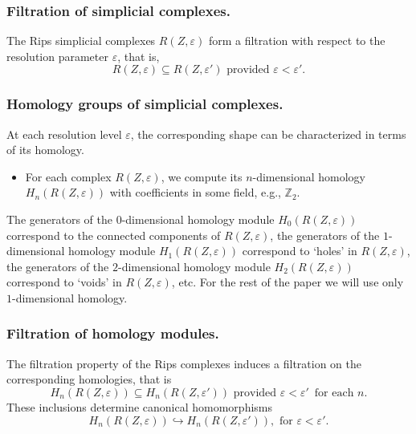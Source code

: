 \documentclass[11pt]{amsart}
\theoremstyle{definition}
\theoremstyle{remark}
\numberwithin{equation}{section}
\newcommand{\eps}{\varepsilon}
\begin{document}
\subsubsection{Filtration of simplicial complexes.} The Rips simplicial complexes $R(Z, \eps)$ form a filtration with respect to the resolution parameter $\eps$, that is, \[R(Z,\eps)\subseteq
R(Z,\eps')\textrm{ provided } \eps<\eps'.\]


\subsubsection{Homology groups of simplicial complexes.}
At each resolution level $\eps$, the corresponding shape can be characterized in terms of its homology.
\begin{itemize}\item For each complex $R(Z, \eps)$, we   compute its $n$-dimensional homology
$H_n(R(Z,\eps))$ with coefficients in some field, e.g., $\mathbb{Z}_2$.
\end{itemize} The generators of the $0$-dimensional homology module $H_0(R(Z,\eps))$  correspond to the
connected components of $R(Z,\eps)$, the generators of the $1$-dimensional homology module  $H_1(R(Z,\eps))$ correspond to   `holes' in $R(Z,\eps)$,  the
generators of the $2$-dimensional homology module  $H_2(R(Z,\eps))$ correspond to  `voids' in $R(Z,\eps)$, etc.
For the rest of the paper we will use only  $1$-dimensional homology.


\subsubsection{Filtration of homology modules.} The filtration property of the Rips complexes induces a filtration on the corresponding homologies, that is
\[H_n(R(Z,\eps))\subseteq H_n(R(Z,\eps')) \textrm{ provided }\eps<\eps'\, \textrm { for each }n.\] These inclusions determine canonical homomorphisms
\[H_n(R(Z,\eps))\hookrightarrow H_n(R(Z,\eps')), \textrm { for }\eps<\eps'.\]
\end{document}
